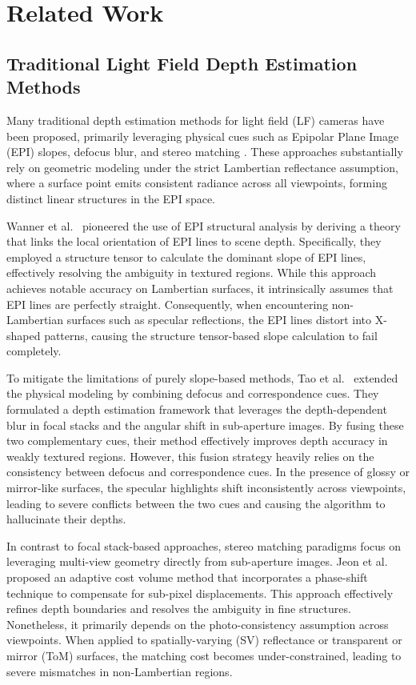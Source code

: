 \documentclass[lettersize,journal]{IEEEtran}
\begin{document}
\section{Related Work}

\subsection{Traditional Light Field Depth Estimation Methods}

Many traditional depth estimation methods for light field (LF) cameras have been proposed, primarily leveraging physical cues such as Epipolar Plane Image (EPI) slopes, defocus blur, and stereo matching \cite{14}. These approaches substantially rely on geometric modeling under the strict Lambertian reflectance assumption, where a surface point emits consistent radiance across all viewpoints, forming distinct linear structures in the EPI space.

Wanner et al.\ \cite{15} pioneered the use of EPI structural analysis by deriving a theory that links the local orientation of EPI lines to scene depth. Specifically, they employed a structure tensor to calculate the dominant slope of EPI lines, effectively resolving the ambiguity in textured regions. While this approach achieves notable accuracy on Lambertian surfaces, it intrinsically assumes that EPI lines are perfectly straight. Consequently, when encountering non-Lambertian surfaces such as specular reflections, the EPI lines distort into X-shaped patterns, causing the structure tensor-based slope calculation to fail completely.

To mitigate the limitations of purely slope-based methods, Tao et al.\ \cite{16} extended the physical modeling by combining defocus and correspondence cues. They formulated a depth estimation framework that leverages the depth-dependent blur in focal stacks and the angular shift in sub-aperture images. By fusing these two complementary cues, their method effectively improves depth accuracy in weakly textured regions. However, this fusion strategy heavily relies on the consistency between defocus and correspondence cues. In the presence of glossy or mirror-like surfaces, the specular highlights shift inconsistently across viewpoints, leading to severe conflicts between the two cues and causing the algorithm to hallucinate their depths.

In contrast to focal stack-based approaches, stereo matching paradigms focus on leveraging multi-view geometry directly from sub-aperture images. Jeon et al.\ \cite{17} proposed an adaptive cost volume method that incorporates a phase-shift technique to compensate for sub-pixel displacements. This approach effectively refines depth boundaries and resolves the ambiguity in fine structures. Nonetheless, it primarily depends on the photo-consistency assumption across viewpoints. When applied to spatially-varying (SV) reflectance or transparent or mirror (ToM) surfaces, the matching cost becomes under-constrained, leading to severe mismatches in non-Lambertian regions.
\end{document}
